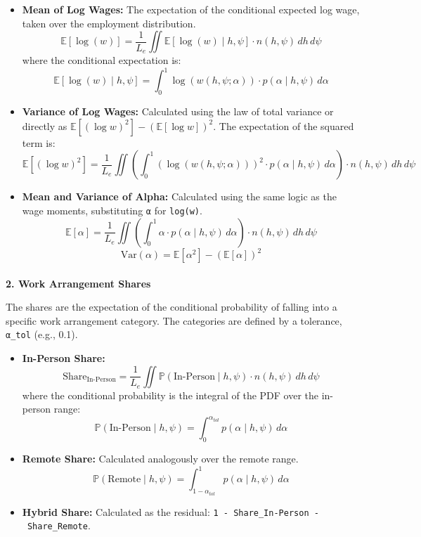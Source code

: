 \documentclass[
  11pt,
  letterpaper,
  DIV=11,
  numbers=noendperiod]{scrartcl}
\makeatletter
\let\oldparagraph\paragraph
\renewcommand{\paragraph}{
    \@ifstar
      \xxxParagraphStar
      \xxxParagraphNoStar
  }
\newcommand{\xxxParagraphStar}[1]{\oldparagraph*{#1}\mbox{}}
\newcommand{\xxxParagraphNoStar}[1]{\oldparagraph{#1}\mbox{}}
\makeatother
\begin{document}
\begin{itemize}
\item
  \textbf{Mean of Log Wages:} The expectation of the conditional
  expected log wage, taken over the employment distribution.
  \[ \mathbb{E}[\log(w)] = \frac{1}{L_e} \iint \mathbb{E}[\log(w) \mid h, \psi] \cdot n(h, \psi) \,dh \,d\psi \]
  where the conditional expectation is:
  \[ \mathbb{E}[\log(w) \mid h, \psi] = \int_0^1 \log(w(h, \psi; \alpha)) \cdot p(\alpha \mid h, \psi) \,d\alpha \]
\item
  \textbf{Variance of Log Wages:} Calculated using the law of total
  variance or directly as
  \(\mathbb{E}[(\log w)^2] - (\mathbb{E}[\log w])^2\). The expectation
  of the squared term is:
  \[ \mathbb{E}[(\log w)^2] = \frac{1}{L_e} \iint \left( \int_0^1 (\log(w(h, \psi; \alpha)))^2 \cdot p(\alpha \mid h, \psi) \,d\alpha \right) \cdot n(h, \psi) \,dh \,d\psi \]
\item
  \textbf{Mean and Variance of Alpha:} Calculated using the same logic
  as the wage moments, substituting \texttt{α} for \texttt{log(w)}.
  \[ \mathbb{E}[\alpha] = \frac{1}{L_e} \iint \left( \int_0^1 \alpha \cdot p(\alpha \mid h, \psi) \,d\alpha \right) \cdot n(h, \psi) \,dh \,d\psi \]
  \[ \text{Var}(\alpha) = \mathbb{E}[\alpha^2] - (\mathbb{E}[\alpha])^2 \]
\end{itemize}

\paragraph{\texorpdfstring{\textbf{2. Work Arrangement
Shares}}{2. Work Arrangement Shares}}\label{work-arrangement-shares}

The shares are the expectation of the conditional probability of falling
into a specific work arrangement category. The categories are defined by
a tolerance, \texttt{α\_tol} (e.g., 0.1).

\begin{itemize}
\item
  \textbf{In-Person Share:}
  \[ \text{Share}_{\text{In-Person}} = \frac{1}{L_e} \iint \mathbb{P}(\text{In-Person} \mid h, \psi) \cdot n(h, \psi) \,dh \,d\psi \]
  where the conditional probability is the integral of the PDF over the
  in-person range:
  \[ \mathbb{P}(\text{In-Person} \mid h, \psi) = \int_0^{\alpha_{tol}} p(\alpha \mid h, \psi) \,d\alpha \]
\item
  \textbf{Remote Share:} Calculated analogously over the remote range.
  \[ \mathbb{P}(\text{Remote} \mid h, \psi) = \int_{1-\alpha_{tol}}^{1} p(\alpha \mid h, \psi) \,d\alpha \]
\item
  \textbf{Hybrid Share:} Calculated as the residual:
  \texttt{1\ -\ Share\_In-Person\ -\ Share\_Remote}.
\end{itemize}
\end{document}
